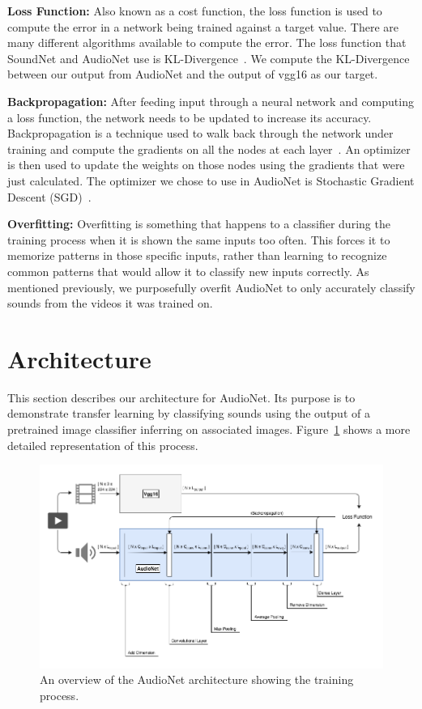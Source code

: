 \documentclass[12pt,twoside]{article}
\theoremstyle{plain}
\theoremstyle{definition}
\theoremstyle{remark}
\begin{document}
\bigskip
\noindent
\textbf{Loss Function:}
Also known as a cost function, the loss function is used to compute the error in a network being trained against a target value.
There are many different algorithms available to compute the error.
The loss function that SoundNet and AudioNet use is KL-Divergence~\cite{kullback:68a}.
We compute the KL-Divergence between our output from AudioNet and the output of vgg16 as our target.

\bigskip
\noindent
\textbf{Backpropagation:}
After feeding input through a neural network and computing a loss function, the network needs to be updated to increase its accuracy.
Backpropagation is a technique used to walk back through the network under training and compute the gradients on all the nodes at each layer~\cite{ChauvinRumelhart95}.
An optimizer is then used to update the weights on those nodes using the gradients that were just calculated.
The optimizer we chose to use in AudioNet is Stochastic Gradient Descent (SGD)~\cite{Bottou:2010}.

\bigskip
\noindent
\textbf{Overfitting:}
Overfitting is something that happens to a classifier during the training process when it is shown the same inputs too often.
This forces it to memorize patterns in those specific inputs, rather than learning to recognize common patterns that would allow it to classify new inputs correctly.
As mentioned previously, we purposefully overfit AudioNet to only accurately classify sounds from the videos it was trained on.


\section{Architecture}
\label{sec:architecture}
This section describes our architecture for AudioNet.
Its purpose is to demonstrate transfer learning by classifying sounds using the output of a pretrained image classifier inferring on associated images.
Figure~\ref{fig:audionet_architecture} shows a more detailed representation of this process.

\begin{figure}[H]
   \centerline{\includegraphics[width=\textwidth]{audionet_architecture.png}}
   {\caption{\footnotesize An overview of the AudioNet architecture showing the training process.}
     \label{fig:audionet_architecture}}
\end{figure}
\end{document}
